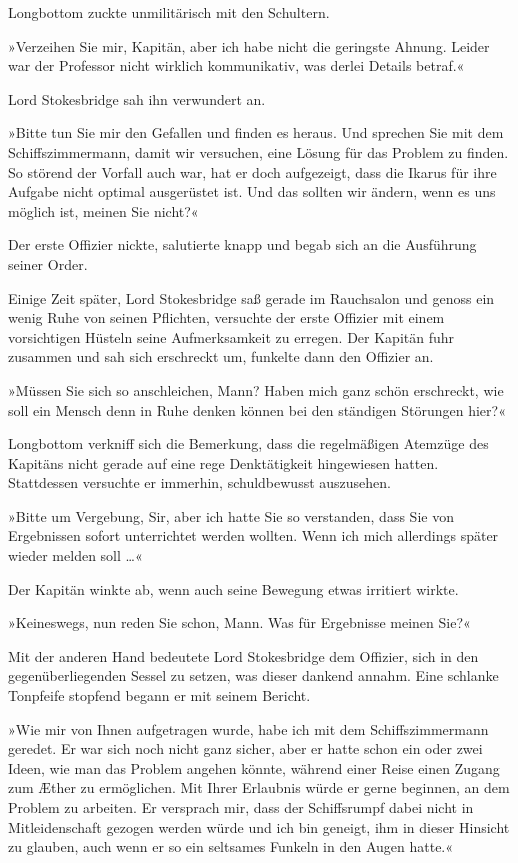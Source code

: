 Longbottom zuckte unmilitärisch mit den Schultern.

»Verzeihen Sie mir, Kapitän, aber ich habe nicht die geringste
Ahnung. Leider war der Professor nicht wirklich kommunikativ, was
derlei Details betraf.«

Lord Stokesbridge sah ihn verwundert an.

»Bitte tun Sie mir den Gefallen und finden es heraus. Und sprechen
Sie mit dem Schiffszimmermann, damit wir versuchen, eine Lösung für
das Problem zu finden. So störend der Vorfall auch war, hat er doch
aufgezeigt, dass die Ikarus für ihre Aufgabe nicht optimal
ausgerüstet ist. Und das sollten wir ändern, wenn es uns möglich
ist, meinen Sie nicht?«

Der erste Offizier nickte, salutierte knapp und begab sich an die
Ausführung seiner Order.

\tb

Einige Zeit später, Lord Stokesbridge saß gerade im Rauchsalon und
genoss ein wenig Ruhe von seinen Pflichten, versuchte der erste
Offizier mit einem vorsichtigen Hüsteln seine Aufmerksamkeit zu
erregen. Der Kapitän fuhr zusammen und sah sich erschreckt um,
funkelte dann den Offizier an.

»Müssen Sie sich so anschleichen, Mann? Haben mich ganz schön
erschreckt, wie soll ein Mensch denn in Ruhe denken können bei den
ständigen Störungen hier?«

Longbottom verkniff sich die Bemerkung, dass die regelmäßigen
Atemzüge des Kapitäns nicht gerade auf eine rege Denktätigkeit
hingewiesen hatten. Stattdessen versuchte er immerhin,
schuldbewusst auszusehen.

»Bitte um Vergebung, Sir, aber ich hatte Sie so verstanden, dass
Sie von Ergebnissen sofort unterrichtet werden wollten. Wenn ich
mich allerdings später wieder melden soll \ldots{}«

Der Kapitän winkte ab, wenn auch seine Bewegung etwas irritiert
wirkte.

»Keineswegs, nun reden Sie schon, Mann. Was für Ergebnisse meinen
Sie?«

Mit der anderen Hand bedeutete Lord Stokesbridge dem Offizier, sich
in den gegenüberliegenden Sessel zu setzen, was dieser dankend
annahm. Eine schlanke Tonpfeife stopfend begann er mit seinem
Bericht.

»Wie mir von Ihnen aufgetragen wurde, habe ich mit dem
Schiffszimmermann geredet. Er war sich noch nicht ganz sicher, aber
er hatte schon ein oder zwei Ideen, wie man das Problem angehen
könnte, während einer Reise einen Zugang zum Æther zu ermöglichen.
Mit Ihrer Erlaubnis würde er gerne beginnen, an dem Problem zu
arbeiten. Er versprach mir, dass der Schiffsrumpf dabei nicht in
Mitleidenschaft gezogen werden würde und ich bin geneigt, ihm in
dieser Hinsicht zu glauben, auch wenn er so ein seltsames Funkeln
in den Augen hatte.«

